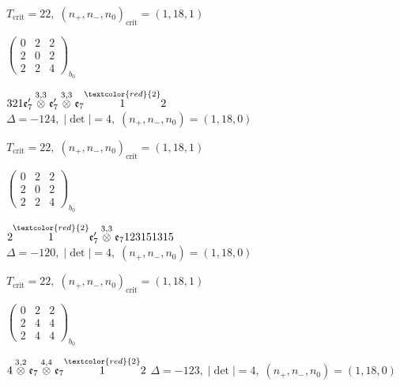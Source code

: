 \documentclass[10pt]{article}
\begin{document}
\hspace{1em}$T_{\text{crit}}=22,\; (n_+,n_-,n_0)_{\text{crit}}=(1,18,1)$

\hspace{2em}$\left(\begin{smallmatrix}0 & 2 & 2 \\ 2 & 0 & 2 \\ 2 & 2 & 4\end{smallmatrix}\right)_{\!b_0}$

\smallskip

$321\mathfrak{e}_7'\overset{3,3}{\otimes}\mathfrak{e}_7'\overset{3,3}{\otimes}\mathfrak{e}_7\overset{\textcolor{red}{2}}{1}2$ \quad $\Delta=-124,\; |\det|=4,\; (n_+,n_-,n_0)=(1,18,0)$

\hspace{1em}$T_{\text{crit}}=22,\; (n_+,n_-,n_0)_{\text{crit}}=(1,18,1)$

\hspace{2em}$\left(\begin{smallmatrix}0 & 2 & 2 \\ 2 & 0 & 2 \\ 2 & 2 & 4\end{smallmatrix}\right)_{\!b_0}$

\smallskip

$2\overset{\textcolor{red}{2}}{1}\mathfrak{e}_7'\overset{3,3}{\otimes}\mathfrak{e}_7123151315$ \quad $\Delta=-120,\; |\det|=4,\; (n_+,n_-,n_0)=(1,18,0)$

\hspace{1em}$T_{\text{crit}}=22,\; (n_+,n_-,n_0)_{\text{crit}}=(1,18,1)$

\hspace{2em}$\left(\begin{smallmatrix}0 & 2 & 2 \\ 2 & 4 & 4 \\ 2 & 4 & 4\end{smallmatrix}\right)_{\!b_0}$

\smallskip

$4\overset{3,2}{\otimes}\mathfrak{e}_7\overset{4,4}{\otimes}\mathfrak{e}_7\overset{\textcolor{red}{2}}{1}2$ \quad $\Delta=-123,\; |\det|=4,\; (n_+,n_-,n_0)=(1,18,0)$
\end{document}
